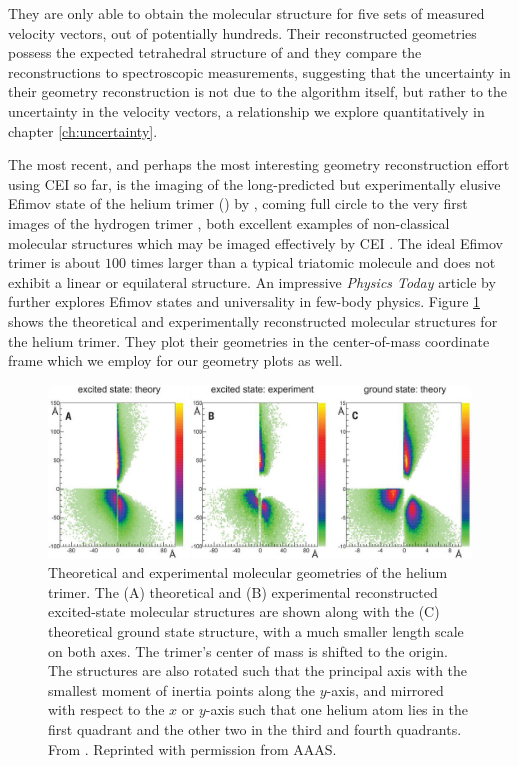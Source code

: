 They are only able to obtain the molecular structure for five sets of measured velocity vectors, out of potentially hundreds. Their reconstructed geometries possess the expected tetrahedral structure of  and they compare the reconstructions to spectroscopic measurements, suggesting that the uncertainty in their geometry reconstruction is not due to the algorithm itself, but rather to the uncertainty in the velocity vectors, a relationship we explore quantitatively in chapter \ref{ch:uncertainty}.

The most recent, and perhaps the most interesting geometry reconstruction effort using CEI so far, is the imaging of the long-predicted but experimentally elusive Efimov state of the helium trimer () by \citet{Kunitski15}, coming full circle to the very first images of the hydrogen trimer \citep{Gaillard78}, both excellent examples of non-classical molecular structures which may be imaged effectively by CEI \citep{Vager89}. The ideal Efimov trimer is about $100$ times larger than a typical triatomic molecule and does not exhibit a linear or equilateral structure. An impressive \emph{Physics Today} article by \citet{Greene10} further explores Efimov states and universality in few-body physics. Figure \ref{fig:heliumTrimerReconstruction} shows the theoretical and experimentally reconstructed molecular structures for the helium trimer. They plot their geometries in the center-of-mass coordinate frame which we employ for our geometry plots as well.

\begin{figure}
  \centering
  \includegraphics[width=\textwidth]{gfx/HeliumTrimerReconstruction}
  \caption[Theoretical and experimental molecular geometries of the helium trimer.]
  {Theoretical and experimental molecular geometries of the helium trimer. The (A) theoretical and (B) experimental reconstructed excited-state molecular structures are shown along with the (C) theoretical ground state structure, with a much smaller length scale on both axes. The trimer's center of mass is shifted to the origin. The structures are also rotated such that the principal axis with the smallest moment of inertia points along the $y$-axis, and mirrored with respect to the $x$ or $y$-axis such that one helium atom lies in the first quadrant and the other two in the third and fourth quadrants. From \citet{Kunitski15}. Reprinted with permission from AAAS.}
  \label{fig:heliumTrimerReconstruction}
\end{figure}

